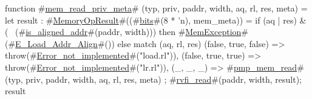 function #\hyperref[sailRISCVzmemzyreadzyprivzymeta]{mem\_read\_priv\_meta}# (typ, priv, paddr, width, aq, rl, res, meta) = {
  let result : #\hyperref[sailRISCVzMemoryOpResult]{MemoryOpResult}#((#\hyperref[sailRISCVzbits]{bits}#(8 * 'n), mem_meta)) =
    if (aq | res) & (~ (#\hyperref[sailRISCVziszyalignedzyaddr]{is\_aligned\_addr}#(paddr, width)))
    then #\hyperref[sailRISCVzMemException]{MemException}#(#\hyperref[sailRISCVzEzyLoadzyAddrzyAlign]{E\_Load\_Addr\_Align}#())
    else match (aq, rl, res) {
      (false, true,  false) => throw(#\hyperref[sailRISCVzErrorzynotzyimplemented]{Error\_not\_implemented}#("load.rl")),
      (false, true,  true)  => throw(#\hyperref[sailRISCVzErrorzynotzyimplemented]{Error\_not\_implemented}#("lr.rl")),
      (_, _, _)             => #\hyperref[sailRISCVzpmpzymemzyread]{pmp\_mem\_read}#(typ, priv, paddr, width, aq, rl, res, meta)
    };
  #\hyperref[sailRISCVzrvfizyread]{rvfi\_read}#(paddr, width, result);
  result
}
